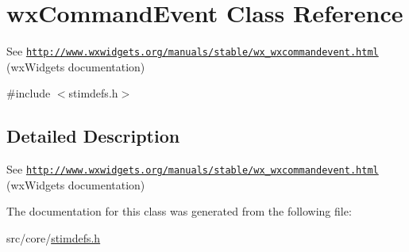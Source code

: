 \hypertarget{classwxCommandEvent}{
\section{wxCommandEvent Class Reference}
\label{classwxCommandEvent}
}


See \href{http://www.wxwidgets.org/manuals/stable/wx_wxcommandevent.html}{\tt http://www.wxwidgets.org/manuals/stable/wx\_\-wxcommandevent.html} (wxWidgets documentation)  




{\ttfamily \#include $<$stimdefs.h$>$}



\subsection{Detailed Description}
See \href{http://www.wxwidgets.org/manuals/stable/wx_wxcommandevent.html}{\tt http://www.wxwidgets.org/manuals/stable/wx\_\-wxcommandevent.html} (wxWidgets documentation) 

The documentation for this class was generated from the following file:\begin{DoxyCompactItemize}
\item 
src/core/\hyperlink{stimdefs_8h}{stimdefs.h}\end{DoxyCompactItemize}
